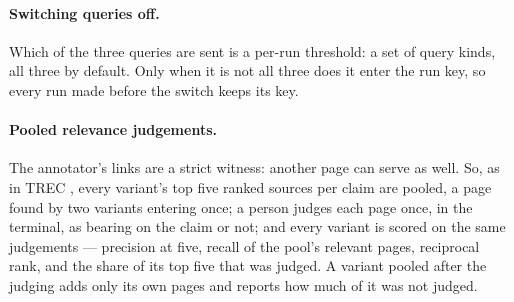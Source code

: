 \paragraph{Switching queries off.} Which of the three queries are sent
is a per-run threshold: a set of query kinds, all three by default.
Only when it is not all three does it enter the run key, so every run
made before the switch keeps its key.

\paragraph{Pooled relevance judgements.} The annotator's links are a
strict witness: another page can serve as well. So, as in TREC
\cite{voorhees2005trec}, every variant's top five ranked sources per
claim are pooled, a page found by two variants entering once; a person
judges each page once, in the terminal, as bearing on the claim or not;
and every variant is scored on the same judgements --- precision at
five, recall of the pool's relevant pages, reciprocal rank, and the
share of its top five that was judged. A variant pooled after the
judging adds only its own pages and reports how much of it was not
judged.
